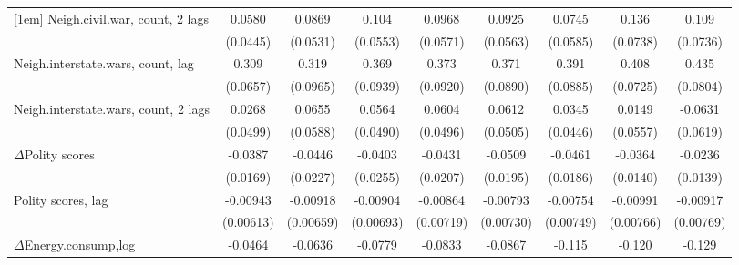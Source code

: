 \begin{table}[htbp]
\begin{tabular}{l*{8}{c}}
[1em]
Neigh.civil.war, count, 2 lags&      0.0580         &      0.0869         &       0.104\sym{*}  &      0.0968\sym{*}  &      0.0925\sym{*}  &      0.0745         &       0.136\sym{*}  &       0.109         \\
                    &    (0.0445)         &    (0.0531)         &    (0.0553)         &    (0.0571)         &    (0.0563)         &    (0.0585)         &    (0.0738)         &    (0.0736)         \\
[1em]
Neigh.interstate.wars, count, lag&       0.309\sym{***}&       0.319\sym{***}&       0.369\sym{***}&       0.373\sym{***}&       0.371\sym{***}&       0.391\sym{***}&       0.408\sym{***}&       0.435\sym{***}\\
                    &    (0.0657)         &    (0.0965)         &    (0.0939)         &    (0.0920)         &    (0.0890)         &    (0.0885)         &    (0.0725)         &    (0.0804)         \\
[1em]
Neigh.interstate.wars, count, 2 lags&      0.0268         &      0.0655         &      0.0564         &      0.0604         &      0.0612         &      0.0345         &      0.0149         &     -0.0631         \\
                    &    (0.0499)         &    (0.0588)         &    (0.0490)         &    (0.0496)         &    (0.0505)         &    (0.0446)         &    (0.0557)         &    (0.0619)         \\
[1em]
$\Delta$Polity scores            &     -0.0387\sym{**} &     -0.0446\sym{**} &     -0.0403         &     -0.0431\sym{**} &     -0.0509\sym{***}&     -0.0461\sym{**} &     -0.0364\sym{***}&     -0.0236\sym{*}  \\
                    &    (0.0169)         &    (0.0227)         &    (0.0255)         &    (0.0207)         &    (0.0195)         &    (0.0186)         &    (0.0140)         &    (0.0139)         \\
[1em]
Polity scores, lag             &    -0.00943         &    -0.00918         &    -0.00904         &    -0.00864         &    -0.00793         &    -0.00754         &    -0.00991         &    -0.00917         \\
                    &   (0.00613)         &   (0.00659)         &   (0.00693)         &   (0.00719)         &   (0.00730)         &   (0.00749)         &   (0.00766)         &   (0.00769)         \\
[1em]
$\Delta$Energy.consump,log             &     -0.0464         &     -0.0636         &     -0.0779         &     -0.0833         &     -0.0867         &      -0.115         &      -0.120         &      -0.129         \\

\end{tabular}
\end{table}

